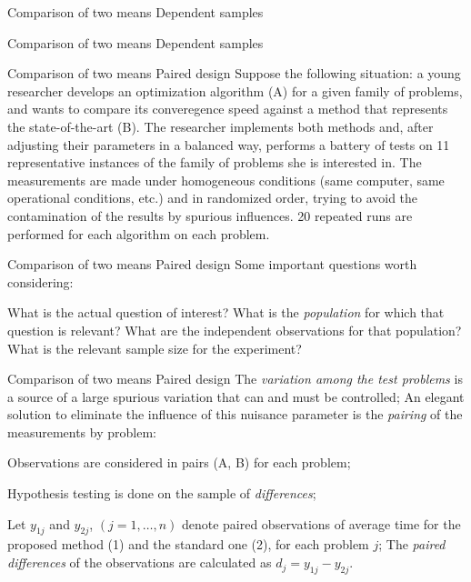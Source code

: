 \documentclass[t]{beamer}
\begin{document}

\begin{ftst}
{Comparison of two means}
{Dependent samples}
\end{ftst}


\begin{ftst}
{Comparison of two means}
{Dependent samples}
\end{ftst}


\begin{ftst}
{Comparison of two means}
{Paired design}
Suppose the following situation: a young researcher develops an optimization algorithm (A) for a given family of problems, and wants to compare its converegence speed against a method that represents the state-of-the-art (B).
\vone
The researcher implements both methods and, after adjusting their parameters in a balanced way, performs a battery of tests on 11 representative instances of the family of problems she is interested in.
\vone
The measurements are made under homogeneous conditions (same computer, same operational conditions, etc.) and in randomized order, trying to avoid the contamination of the results by spurious influences. 20 repeated runs are performed for each algorithm on each problem.
\end{ftst}


\begin{ftst}
{Comparison of two means}
{Paired design}
Some important questions worth considering:

\bitems What is the actual question of interest?
\spitem What is the \textit{population} for which that question is relevant?
\spitem What are the independent observations for that population?
\spitem What is the relevant sample size for the experiment?
\eitem
\end{ftst}


\begin{ftst}
{Comparison of two means}
{Paired design}
The \textit{variation among the test problems} is a source of a large spurious variation that can and must be controlled;
\vone
An elegant solution to eliminate the influence of this nuisance parameter is the \textit{pairing} of the measurements by problem:

\bitems Observations are considered in pairs (A, B) for each problem; 
\item Hypothesis testing is done on the sample of \textit{differences};
\eitem

Let $y_{1j}$ and $y_{2j}$, $(j=1,\ldots,n)$ denote paired observations of average time for the proposed method (1) and the standard one (2), for each problem $j$;
\vhalf 
The \textit{paired differences} of the observations are calculated as $d_j = y_{1j} - y_{2j}$.
\end{ftst}
\end{document}
